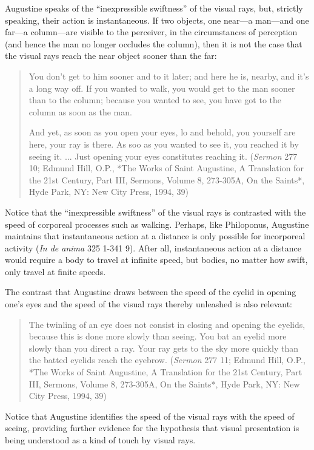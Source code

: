 \documentclass[12pt]{article}
\begin{document}
Augustine speaks of the ``inexpressible swiftness'' of the visual rays, but, strictly speaking, their action is instantaneous. If two objects, one near---a man---and one far---a column---are visible to the perceiver, in the circumstances of perception (and hence the man no longer occludes the column), then it is not the case that the visual rays reach the near object sooner than the far: 
\begin{quotation}
	You don't get to him sooner and to it later; and here he is, nearby, and it's a long way off. If you wanted to walk, you would get to the man sooner than to the column; because you wanted to see, you have got to the column as soon as the man. 
	
	And yet, as soon as you open your eyes, lo and behold, you yourself are here, your ray is there. As soo as you wanted to see it, you reached it by seeing it. ... Just opening your eyes constitutes reaching it. (\emph{Sermon} 277 10; Edmund Hill, O.P., *The Works of Saint Augustine, A Translation for the 21st Century, Part III, Sermons, Volume 8, 273-305A, On the Saints*, Hyde Park, NY: New City Press, 1994, 39)
\end{quotation}

Notice that the ``inexpressible swiftness'' of the visual rays is contrasted with the speed of corporeal processes such as walking. Perhaps, like Philoponus, Augustine maintains that instantaneous action at a distance is only possible for incorporeal activity (\emph{In de anima} 325 1-341 9). After all, instantaneous action at a distance would require a body to travel at infinite speed, but bodies, no matter how swift, only travel at finite speeds. 

The contrast that Augustine draws between the speed of the eyelid in opening one's eyes and the speed of the visual rays thereby unleashed is also relevant:
\begin{quote}
	The twinling of an eye does not consist in closing and opening the eyelids, because this is done more slowly than seeing. You bat an eyelid more slowly than you direct a ray. Your ray gets to the sky more quickly than the batted eyelids reach the eyebrow. (\emph{Sermon} 277 11; Edmund Hill, O.P., *The Works of Saint Augustine, A Translation for the 21st Century, Part III, Sermons, Volume 8, 273-305A, On the Saints*, Hyde Park, NY: New City Press, 1994, 39)
\end{quote}
Notice that Augustine identifies the speed of the visual rays with the speed of seeing, providing further evidence for the hypothesis that visual presentation is being understood as a kind of touch by visual rays.
\end{document}
